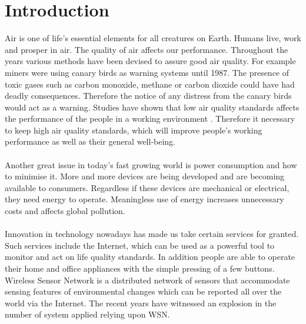\documentclass[12pt,a4paper]{report}
\begin{document}
\chapter{Introduction}
%
Air is one of life's essential elements for all creatures on Earth. Humans live, work and prosper in air. The quality of air affects our performance. Throughout the years various methods have been devised to assure good air quality. For example miners were using canary birds as warning systems until 1987. The presence of toxic gases such as carbon monoxide, methane or carbon dioxide could have had deadly consequences. Therefore the notice of any distress from the canary birds would act as a warning. Studies have shown that low air quality standards affects the performance of the people in a working environment \cite{airquality}. Therefore it necessary to keep high air quality standards, which will improve people's working performance as well as their general well-being.\\
\ \\
Another great issue in today's fast growing world is power consumption and how to minimise it. More and more devices are being developed and are becoming available to consumers. Regardless if these devices are mechanical or electrical, they need energy to operate. Meaningless use of energy increases unnecessary costs and affects global pollution.\\
\ \\
Innovation in technology nowadays has made us take certain services for granted. Such services include the Internet, which can be used as a powerful tool to monitor and act on life quality standards. In addition people are able to operate their home and office appliances with the simple pressing of a few buttons. Wireless Sensor Network is a distributed network of sensors that accommodate sensing features of environmental changes which can be reported all over the world via the Internet. The recent years have witnessed an explosion in the number of system applied relying upon WSN.\\
\ \\
\end{document}
